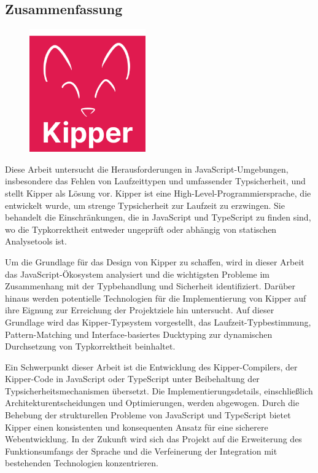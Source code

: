 \begin{spacing}{1}
	\chapter*{Zusammenfassung}
\end{spacing}
\begin{figure}
	\begin{center}
		\includegraphics[height=200px]{pics/Kipper-Logo.png}
	\end{center}
\end{figure}

Diese Arbeit untersucht die Herausforderungen in JavaScript-Umgebungen, insbesondere das Fehlen von Laufzeittypen und umfassender Typsicherheit, und stellt Kipper als Lösung vor. Kipper ist eine High-Level-Programmiersprache, die entwickelt wurde, um strenge Typsicherheit zur Laufzeit zu erzwingen. Sie behandelt die Einschränkungen, die in JavaScript und TypeScript zu finden sind, wo die Typkorrektheit entweder ungeprüft oder abhängig von statischen Analysetools ist.

Um die Grundlage für das Design von Kipper zu schaffen, wird in dieser Arbeit das JavaScript-Ökosystem analysiert und die wichtigsten Probleme im Zusammenhang mit der Typbehandlung und Sicherheit identifiziert. Darüber hinaus werden potentielle Technologien für die Implementierung von Kipper auf ihre Eignung zur Erreichung der Projektziele hin untersucht. Auf dieser Grundlage wird das Kipper-Typsystem vorgestellt, das Laufzeit-Typbestimmung, Pattern-Matching und Interface-basiertes Ducktyping zur dynamischen Durchsetzung von Typkorrektheit beinhaltet.

Ein Schwerpunkt dieser Arbeit ist die Entwicklung des Kipper-Compilers, der Kipper-Code in JavaScript oder TypeScript unter Beibehaltung der Typsicherheitsmechanismen übersetzt. Die Implementierungsdetails, einschließlich Architekturentscheidungen und Optimierungen, werden abgewogen. Durch die Behebung der strukturellen Probleme von JavaScript und TypeScript bietet Kipper einen konsistenten und konsequenten Ansatz für eine sicherere Webentwicklung. In der Zukunft wird sich das Projekt auf die Erweiterung des Funktionsumfangs der Sprache und die Verfeinerung der Integration mit bestehenden Technologien konzentrieren.

